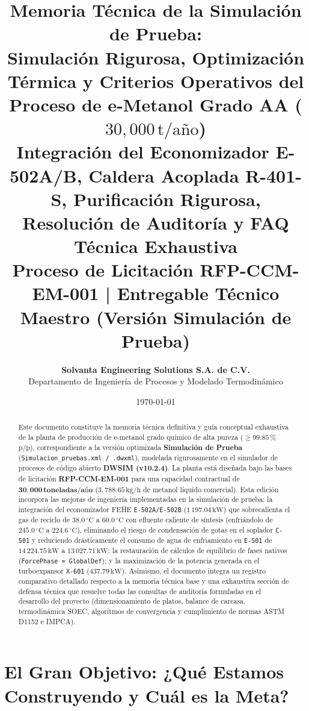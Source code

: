 \documentclass[11pt,a4paper]{article}
\title{\vspace{-1.2cm}
    \textbf{\LARGE \color{solvantablue} Memoria Técnica de la Simulación de Prueba:}\\[0.3cm]
    \textbf{\Large Simulación Rigurosa, Optimización Térmica y Criterios Operativos del Proceso de e-Metanol Grado AA ($30{,}000\,\text{t/año}$)}\\[0.2cm]
    \textbf{\large Integración del Economizador E-502A/B, Caldera Acoplada R-401-S, Purificación Rigurosa, Resolución de Auditoría y FAQ Técnica Exhaustiva}\\[0.4cm]
    \normalsize Proceso de Licitación RFP-CCM-EM-001 | Entregable Técnico Maestro (Versión Simulación de Prueba)
}
\author{\textbf{Solvanta Engineering Solutions S.A. de C.V.}\\
Departamento de Ingeniería de Procesos y Modelado Termodinámico}
\date{\today}
\begin{document}
\maketitle

\begin{abstract}
Este documento constituye la memoria técnica definitiva y guía conceptual exhaustiva de la planta de producción de e-metanol grado químico de alta pureza ($\ge 99.85\,\%$ p/p), correspondiente a la versión optimizada \textbf{Simulación de Prueba} (\texttt{Simulacion\_pruebas.xml / .dwxml}), modelada rigurosamente en el simulador de procesos de código abierto \textbf{DWSIM (v10.2.4)}. La planta está diseñada bajo las bases de licitación \textbf{RFP-CCM-EM-001} para una capacidad contractual de $\mathbf{30{,}000\,\text{toneladas/año}}$ ($3{,}788.65\,\text{kg/h}$ de metanol líquido comercial). Esta edición incorpora las mejoras de ingeniería implementadas en la simulación de prueba: la integración del economizador FEHE \texttt{E-502A/E-502B} ($1\,197.04\,\text{kW}$) que sobrecalienta el gas de reciclo de $38.0\,^\circ\text{C}$ a $60.0\,^\circ\text{C}$ con efluente caliente de síntesis (enfriándolo de $245.0\,^\circ\text{C}$ a $224.6\,^\circ\text{C}$), eliminando el riesgo de condensación de gotas en el soplador \texttt{C-501} y reduciendo drásticamente el consumo de agua de enfriamiento en \texttt{E-501} de $14\,224.75\,\text{kW}$ a $13\,027.71\,\text{kW}$; la restauración de cálculos de equilibrio de fases nativos (\texttt{ForcePhase = GlobalDef}); y la maximización de la potencia generada en el turboexpansor \texttt{X-601} ($437.79\,\text{kW}$). Asimismo, el documento integra un registro comparativo detallado respecto a la memoria técnica base y una exhaustiva sección de defensa técnica que resuelve todas las consultas de auditoría formuladas en el desarrollo del proyecto (dimensionamiento de platos, balance de carcasa, termodinámica SOEC, algoritmos de convergencia y cumplimiento de normas ASTM D1152 e IMPCA).
\end{abstract}

\tableofcontents
\newpage

\section{El Gran Objetivo: ¿Qué Estamos Construyendo y Cuál es la Meta?}
\end{document}
